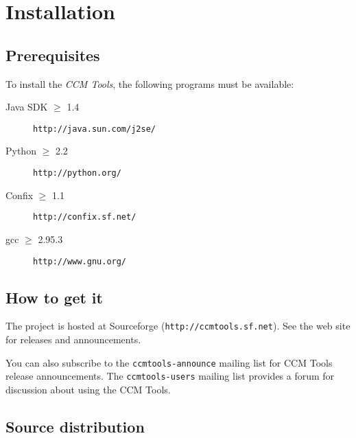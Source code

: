 
\chapter{Installation}

\section{Prerequisites}

To install the {\it CCM Tools}, the following programs must be available:
\begin{description}
\item [Java SDK $\ge$ 1.4] {\tt http://java.sun.com/j2se/}
\item [Python $\ge$ 2.2] {\tt http://python.org/}
\item [Confix $\ge$ 1.1] {\tt http://confix.sf.net/}
\item [gcc $\ge$ 2.95.3] {\tt http://www.gnu.org/}
\end{description}

\section{How to get it}

The project is hosted at Sourceforge ({\tt http://ccmtools.sf.net}). See the web
site for releases and announcements.

You can also subscribe to the {\tt ccmtools-announce} mailing list for CCM Tools
release announcements. The {\tt ccmtools-users} mailing list provides a forum
for discussion about using the CCM Tools.

\section{Source distribution}

